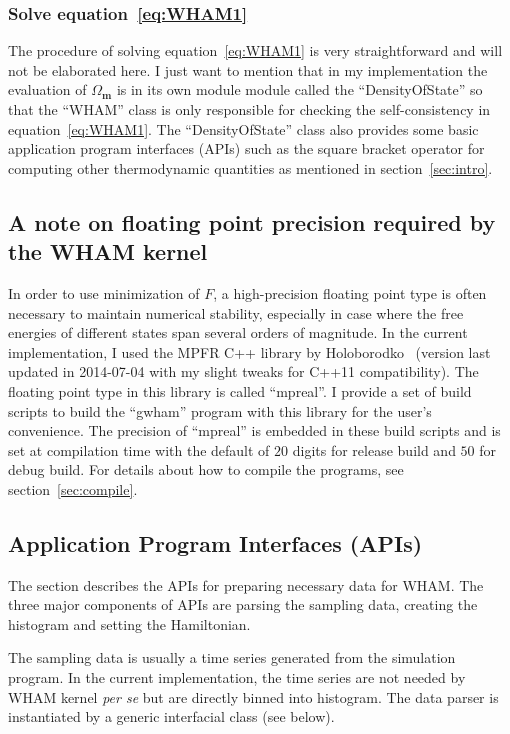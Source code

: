 \subsubsection{Solve equation~\ref{eq:WHAM1}}
The procedure of solving equation~\ref{eq:WHAM1} is very straightforward and
will not be elaborated here. I just want to mention that in my implementation
the evaluation of $\Omega_{\mathbf{m}}$ is in its own module module called the
``DensityOfState'' so that the ``WHAM'' class is only responsible for checking
the self-consistency in equation~\ref{eq:WHAM1}.  The ``DensityOfState'' class
also provides some basic application program interfaces (APIs) such as the
square bracket operator for computing other thermodynamic quantities as
mentioned in section~\ref{sec:intro}.

\subsection{A note on floating point precision required by the WHAM kernel}\label{sec:prec}
In order to use minimization of $F$, a high-precision floating point type is
often necessary to maintain numerical stability, especially in case where the
free energies of different states span several orders of magnitude. In the
current implementation, I used the MPFR C++ library by
Holoborodko~\cite{mpfrcpp2014} (version last updated in 2014-07-04 with my
slight tweaks for C++11 compatibility). The floating point type in this library
is called ``mpreal''. I provide a set of build scripts to build the ``gwham''
program with this library for the user's convenience. The precision of
``mpreal'' is embedded in these build scripts and is set at compilation time
with the default of $20$ digits for release build and $50$ for debug build. For
details about how to compile the programs, see section~\ref{sec:compile}.

\subsection{Application Program Interfaces (APIs)}\label{sec:api}
The section describes the APIs for preparing necessary data for WHAM. The three
major components of APIs are parsing the sampling data, creating the histogram 
and setting the Hamiltonian.

The sampling data is usually a time series generated from the simulation
program. In the current implementation, the time series are not needed by WHAM
kernel \textit{per se} but are directly binned into histogram. The data parser 
is instantiated by a generic interfacial class (see below). 

